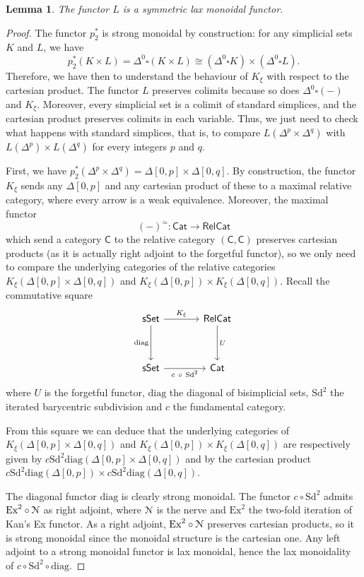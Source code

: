 \documentclass{proc-l}
\renewcommand{\mathcal}{\EuScript}
\theoremstyle{plain}
\newtheorem{lemma}[{theorem}]{Lemma}
\theoremstyle{definition}
\theoremstyle{remark}
\begin{document}
\begin{lemma}%
\label{Lemma:A.8}\label{lemma:laxmonL}
The functor $L$ is a symmetric lax monoidal functor.
\end{lemma}
\begin{proof}
The functor $p_2^*$ is strong monoidal by construction: for any simplicial sets $K$ and $L$, we have
\[
p_2^*(K\times L) = \Delta^0\square (K\times L)\cong (\Delta^0\square K) \times (\Delta^0\square L).
\]
Therefore, we have then to understand the behaviour of $K_{\xi}$ with respect to the cartesian product. The functor $L$ preserves colimits because so does $\Delta^0\square (-)$ and $K_{\xi}$. Moreover, every simplicial set is a colimit of standard simplices, and the cartesian product preserves colimits in each variable. Thus, we just need to check what happens with standard simplices, that is, to compare $L(\Delta^p\times\Delta^q)$ with $L(\Delta^p)\times L(\Delta^q)$ for every integers $p$ and $q$.

First, we have $p_2^*(\Delta^p\times\Delta^q) = \Delta[0,p]\times\Delta[0,q]$. By construction, the functor $K_{\xi}$ sends any $\Delta[0,p]$ and any cartesian product of these to a maximal relative category, where every arrow is a weak equivalence. Moreover, the maximal functor
\[
(-)^{\simeq}: \mathsf{Cat} \longrightarrow \mathsf{RelCat}
\]
which send a category $\mathsf{C}$ to the relative category  $(\mathsf{C},\mathsf{C})$ preserves cartesian products (as it is actually right adjoint to the forgetful functor), so we only need to compare the underlying categories of the relative categories $K_{\xi}(\Delta[0,p]\times\Delta[0,q])$ and $K_{\xi}(\Delta[0,p])\times K_{\xi}(\Delta[0,q])$. Recall the commutative square
\[
\begin{tikzcd}[column sep=3pc,row sep=3pc]
\mathsf{sSet} \arrow[r, "K_{\xi}"] \arrow[d, "\mathrm{diag}"']
&\mathsf{RelCat} \arrow[d, "U"] \\
\mathsf{sSet} \arrow[r, "c ~ \circ ~\mathrm{Sd}^2"']
& \mathsf{Cat}
\end{tikzcd}
\]
where $U$ is the forgetful functor, $\mathrm{diag}$ the diagonal of bisimplicial sets, $\mathrm{Sd}^2$ the iterated barycentric subdivision and $c$ the fundamental category.

From this square we can deduce that the underlying categories of
$K_{\xi}(\Delta[0,p]\times\Delta[0,q])$ and $K_{\xi}(\Delta[0,p])\times K_{\xi}(\Delta[0,q])$ are respectively given by $c\mathrm{Sd}^2\mathrm{diag}(\Delta[0,p] \times\Delta[0,q])$ and by the cartesian product $c\mathrm{Sd}^2\mathrm{diag}(\Delta[0,p]) \times c\mathrm{Sd}^2\mathrm{diag}(\Delta[0,q])$.

The diagonal functor $\mathrm{diag}$ is clearly strong monoidal. The functor $c\circ \mathrm{Sd}^2$ admits $\mathrm{Ex}^2\circ\mathcal{N}$ as right adjoint, where $\mathcal{N}$ is the nerve and $\mathrm{Ex}^2$ the two-fold iteration of Kan's Ex functor. As a right adjoint, $\mathrm{Ex}^2\circ\mathcal{N}$ preserves cartesian products, so it is strong monoidal since the monoidal structure is the cartesian one. Any left adjoint to a strong monoidal functor is lax monoidal, hence the lax monoidality of $c\circ \mathrm{Sd}^2\circ \mathrm{diag}$.
\end{proof}
\end{document}
